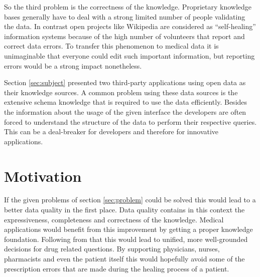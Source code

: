 So the third problem is the correctness of the knowledge.
Proprietary knowledge bases generally have to deal with a strong limited number of people validating the data.
In contrast open projects like Wikipedia are considered as ``self-healing'' information systems because of the high number of volunteers that report and correct data errors.
To transfer this phenomenon to medical data it is unimaginable that everyone could edit such important information, but reporting errors would be a strong impact nonetheless.

Section \ref{sec:subject} presented two third-party applications using open data as their knowledge sources.
A common problem using these data sources is the extensive schema knowledge that is required to use the data efficiently. 
Besides the information about the usage of the given interface the developers are often forced to understand the structure of the data to perform their respective queries.
This can be a deal-breaker for developers and therefore for innovative applications.

\section{Motivation}
\label{sec:motivation}

If the given problems of section \ref{sec:problem} could be solved this would lead to a better data quality in the first place.
Data quality contains in this context the expressiveness, completeness and correctness of the knowledge.
Medical applications would benefit from this improvement by getting a proper knowledge foundation.
Following from that this would lead to unified, more well-grounded decisions for drug related questions.
By supporting physicians, nurses, pharmacists and even the patient itself this would hopefully avoid some of the prescription errors that are made during the healing process of a patient.

